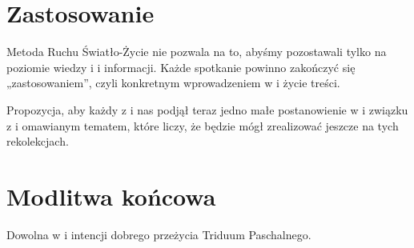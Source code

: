 \documentclass[a5paper,10pt,polish]{book}
\begin{document}
\section{Zastosowanie}
\label{babice2006-wiosna-knurow/spotkanie2:zastosowanie}
Metoda Ruchu Światło-Życie nie pozwala na to, abyśmy pozostawali tylko na poziomie wiedzy i i informacji. Każde spotkanie powinno zakończyć się
„zastosowaniem”, czyli konkretnym wprowadzeniem w i życie treści.

Propozycja, aby każdy z i nas podjął teraz jedno małe postanowienie w i związku z i omawianym tematem, które liczy, że będzie mógł zrealizować jeszcze na tych rekolekcjach.


\section{Modlitwa końcowa}
\label{babice2006-wiosna-knurow/spotkanie2:modlitwa-koncowa}
Dowolna w i intencji dobrego przeżycia Triduum Paschalnego.
\end{document}
